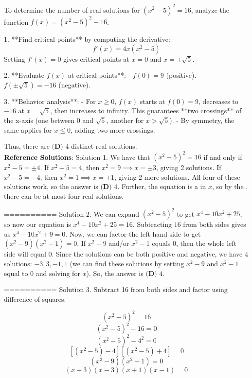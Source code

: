{To determine the number of real solutions for \((x^2 - 5)^2 = 16\), analyze the function \(f(x) = (x^2 - 5)^2 - 16\). 

1. **Find critical points** by computing the derivative:
   \[
   f'(x) = 4x(x^2 - 5)
   \]
   Setting \(f'(x) = 0\) gives critical points at \(x = 0\) and \(x = \pm \sqrt{5}\).

2. **Evaluate \(f(x)\) at critical points**:
   - \(f(0) = 9\) (positive).
   - \(f(\pm \sqrt{5}) = -16\) (negative).

3. **Behavior analysis**:
   - For \(x \geq 0\), \(f(x)\) starts at \(f(0) = 9\), decreases to \(-16\) at \(x = \sqrt{5}\), then increases to infinity. This guarantees **two crossings** of the x-axis (one between \(0\) and \(\sqrt{5}\), another for \(x > \sqrt{5}\)).
   - By symmetry, the same applies for \(x \leq 0\), adding two more crossings.

Thus, there are \(\boxed{\textbf{(D) }4}\) distinct real solutions. \\
    \textbf{Reference Solutions}: Solution 1. We have that $(x^2-5)^2 = 16$ if and only if $x^2-5 = \pm 4$. If $x^2-5 = 4$, then $x^2 = 9 \implies x = \pm 3$, giving 2 solutions. If $x^2-5 = -4$, then $x^2 = 1 \implies x = \pm 1$, giving 2 more solutions. All four of these solutions work, so the answer is $\boxed{\textbf{(D) }4}$. Further, the equation is a  in $x$, so by the , there can be at most four real solutions.


==========
Solution 2. We can expand $(x^2-5)^2$ to get $x^4-10x^2+25$, so now our equation is $x^4-10x^2+25=16$. Subtracting $16$ from both sides gives us $x^4-10x^2+9=0$. Now, we can factor the left hand side to get $(x^2-9)(x^2-1)=0$. If $x^2-9$ and/or $x^2-1$ equals $0$, then the whole left side will equal $0$. Since the solutions can be both positive and negative, we have $4$ solutions: $-3,3,-1,1$ (we can find these solutions by setting $x^2-9$ and $x^2-1$ equal to $0$ and solving for $x$). So, the answer is $\boxed{\textbf{(D) }4}$. 


==========
Solution 3. Subtract 16 from both sides and factor using difference of squares: 

\[(x^2 - 5)^2 = 16\]
\[(x^2 - 5)^2 - 16 =0\]
\[(x^2 - 5)^2 - 4^2 = 0\]
\[[(x^2 - 5)-4][(x^2 - 5) + 4] = 0\]
\[(x^2 - 9)(x^2 - 1) =0\]
\[(x+3)(x-3)(x+1)(x-1) = 0\]

}
